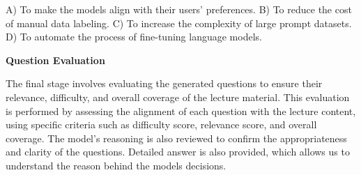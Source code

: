 {\begin{tcolorbox}[skin=widget,
		coltitle=black,
		colframe=brsu_blue!30,
		colback=brsu_blue!10,
  		adjusted title=Example multiple choice question:,
		boxrule=2mm]
	A) To make the models align with their users' preferences.\newline
	B) To reduce the cost of manual data labeling.\newline
	C) To increase the complexity of large prompt datasets.\newline
	D) To automate the process of fine-tuning language models.\newline

	\end{tcolorbox}

 	\bigbreak
	\bigbreak
	\textbf{Question Evaluation}
	
	The final stage involves evaluating the generated questions to ensure their relevance, difficulty, and overall coverage of the lecture material. This evaluation is performed by assessing the alignment of each question with the lecture content, using specific criteria such as difficulty score, relevance score, and overall coverage. The model's reasoning is also reviewed to confirm the appropriateness and clarity of the questions. Detailed answer is also provided, which allows us to understand the reason behind the models decisions. 
}

